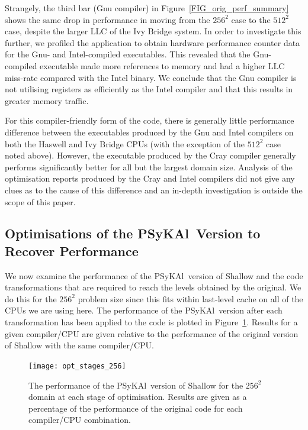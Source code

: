 \documentclass{IOS-Book-Article}
\newcommand{\psykal}{{PS}y{KA}l}
\begin{document}
Strangely, the third bar (Gnu compiler) in
Figure~\ref{FIG_orig_perf_summary} shows the same drop in performance
in moving from the $256^2$ case to the $512^2$ case, despite the
larger LLC of the Ivy Bridge system. In order to investigate this
further, we profiled the application to obtain hardware performance
counter data for the Gnu- and Intel-compiled executables. This
revealed that the Gnu-compiled executable made more references to
memory and had a higher LLC miss-rate compared with the Intel binary.
We conclude that the Gnu compiler is not utilising registers as
efficiently as the Intel compiler and that this results in greater
memory traffic.

For this compiler-friendly form of the code, there is generally little
performance difference between the executables produced by the Gnu and
Intel compilers on both the Haswell and Ivy Bridge CPUs (with the
exception of the $512^2$ case noted above). However, the executable
produced by the Cray compiler generally performs significantly better
for all but the largest domain size. Analysis of the optimisation
reports produced by the Cray and Intel compilers did not give any
clues as to the cause of this difference and an in-depth investigation
is outside the scope of this paper.

\subsection{Optimisations of the \psykal\ Version to Recover Performance}

We now examine the performance of the \psykal\ version of Shallow and
the code transformations that are required to reach the levels obtained
by the original.  We do this for the $256^{2}$ problem size since this
fits within last-level cache on all of the CPUs we are using here.
The performance of the \psykal\ version after each transformation has
been applied to the code is plotted in
Figure~\ref{FIG_opt_stages_256}. Results for a given compiler/CPU are
given relative to the performance of the original version of Shallow
with the same compiler/CPU.

\begin{figure}[!t]
\centering
\texttt{[image: opt\_stages\_256]}
\caption{The performance of the \psykal\ version of Shallow for the
  $256^{2}$ domain at each stage of optimisation. Results are given as
  a percentage of the performance of the original code for each
  compiler/CPU combination.}
\label{FIG_opt_stages_256}
\end{figure}
\end{document}
